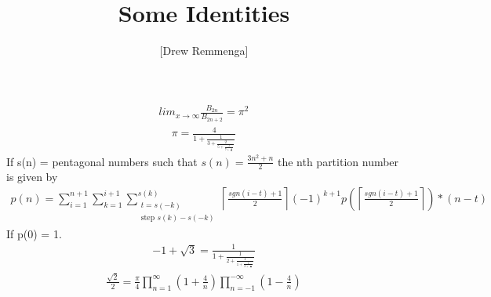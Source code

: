 \documentclass[10pt, oneside]{article}
\title{Some Identities}
\author{[Drew Remmenga]}
\begin{document}
\maketitle

\vspace{.25in}
\begin{align}
    lim_{x\to \infty}\frac{B_{2n}}{B_{2n+2}}=\pi^{2}
\end{align}
\begin{align}
    \pi = \frac{4}{1+\frac{1}{3+\frac{2}{5+\frac{3}{7+\frac{4}{\dots}}}}}
\end{align}
If s(n) = pentagonal numbers such that $s(n)= \frac{3n^{2}+n}{2}$ the nth partition number is given by 
\begin{align*}
    p(n) = \sum_{i=1}^{n+1}\sum_{k=1}^{i+1}\sum_{\substack{t=s(-k)\\\text{step }s(k)-s(-k)}}^{s(k)}\left\lceil\frac{sgn(i-t)+1}{2}\right\rceil(-1)^{k+1}p(\left\lceil\frac{sgn(i-t)+1}{2}\right\rceil)*(n-t)
\end{align*}
If p(0) = 1.
\begin{align*}
    -1+\sqrt{3}=\frac{1}{1+\frac{1}{2+\frac{1}{1+\frac{1}{2+\frac{1}{\dots}}}}}
\end{align*}
\begin{align*}
    \frac{\sqrt{2}}{2} = \frac{\pi}{4}\prod_{n=1}^{\infty}(1+\frac{4}{n})\prod_{n=-1}^{-\infty}(1-\frac{4}{n})
\end{align*}   
\end{document}

